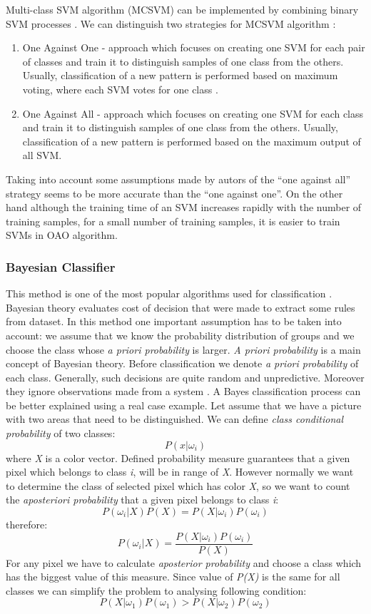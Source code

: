	Multi-class SVM algorithm (MCSVM) can be implemented by combining binary SVM processes \cite{multi-svm}. We can distinguish two strategies for MCSVM algorithm \cite{mcsvm}:
	\begin{enumerate}
	\item One Against One - approach which focuses on creating one SVM for each pair of classes and train it to distinguish samples of one class from the others. Usually, classification   of  a new pattern  is  performed based on maximum voting, where each SVM votes for one class \cite{mcsvm}.
	\item One Against All - approach which focuses on creating one SVM for each class and train it to distinguish samples of one class from the others. Usually, classification   of  a new pattern  is  performed based on the  maximum output of all SVM. \cite{mcsvm}
	\end{enumerate} 
	Taking into account some assumptions made by autors of \cite{mcsvm}  the   “one   against all”   strategy   seems to be   more  accurate   than   the   “one   against   one”. On the other hand although the  training  time  of an SVM  increases  rapidly with  the  number  of training samples, for a small number of training samples, it is easier to train SVMs in OAO algorithm.
	\subsubsection{Bayesian Classifier}
	This method is one of the most popular algorithms used for classification \cite{fe_signal_processing}. Bayesian theory evaluates cost of decision that were made to extract some rules from dataset. In this method one important assumption has to be taken into account: we assume that we know the probability distribution of groups and we choose the class whose \textit{a priori probability} is larger. \textit{A priori probability} is a main concept of Bayesian theory. Before classification we denote \textit{a priori probability} of each class. Generally, such decisions are quite random and unpredictive. Moreover they ignore observations made from a system \cite{fe_signal_processing}. 
	A Bayes classification process  can be better explained using a real case example. Let assume that we have a picture with two areas that need to be distinguished.  We can define \textit{class conditional probability} of two classes:
	\[P(x|\omega _i)\]
where \textit{X} is a color vector. Defined probability measure guarantees that a given pixel which belongs to class \textit{i}, will be in range of \textit{X}. However normally we want to determine the class of selected pixel which has color \textit{X}, so we want to count the \textit{aposteriori probability} that a given pixel belongs to class \textit{i}:
\[P(\omega _i|X)P(X)=P(X|\omega_i)P(\omega_i)\]
therefore:
\[P(\omega _i|X)=\frac{P(X|\omega_i)P(\omega_i)}{P(X)}\]
For any pixel we have to calculate \textit{aposterior probability} and choose a class which has the biggest value of this measure. Since value of \textit{P(X)} is the same for all classes we can simplify the problem to analysing following condition:
\[{P(X|\omega_1)P(\omega_1)} > {P(X|\omega_2)P(\omega_2)}\]

